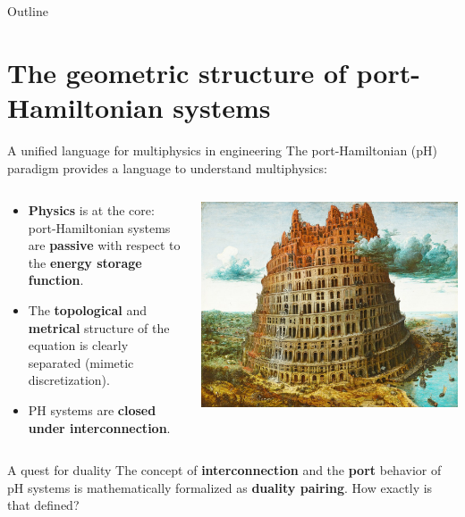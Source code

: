 \documentclass[aspectratio=169]{beamer}
\begin{document}
	
	
	\begin{frame}[plain]
		
		
		
	\end{frame}
	
	
	\begin{frame}{Outline}
		
		\tableofcontents
		
	\end{frame}


\section{The geometric structure of port-Hamiltonian systems}

\begin{frame}{A unified language for multiphysics in engineering}
	The port-Hamiltonian (pH) paradigm provides a language to understand multiphysics:
	\vspace{.3cm}
	\begin{columns}
		\begin{column}{.65\textwidth}
			\begin{itemize}
				\item \textbf{Physics} is at the core: port-Hamiltonian systems are \textbf{passive} with respect to the \textbf{energy storage function}.
				\item The \textbf{topological} and \textbf{metrical} structure of the equation is clearly separated (mimetic discretization).
				\item PH systems are \textbf{closed under interconnection}. 
			\end{itemize}
		\end{column}
		\begin{column}{.35\textwidth}
			\centering
			\includegraphics[width=.9\columnwidth]{babel_tower.jpeg}
		\end{column}
	\end{columns}
	\begin{block}{A quest for duality}
		The concept of \textbf{interconnection} and the \textbf{port} behavior of pH systems is mathematically formalized as \textbf{duality pairing}. How exactly is that defined?
	\end{block}
	

\end{frame}
\end{document}
